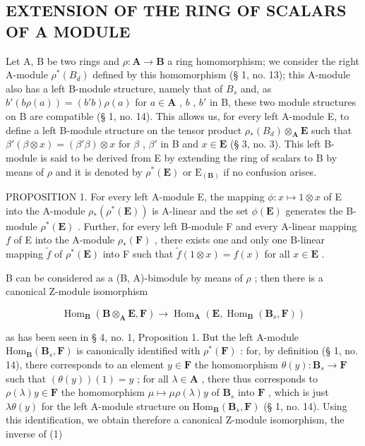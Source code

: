 \subsection{EXTENSION OF THE RING OF SCALARS OF A MODULE}

Let A, B be two rings and \(\rho: \mathbf{A} \to \mathbf{B}\) a ring homomorphism; we consider the right A-module \(\rho^{*}(B_{d})\) defined by this homomorphism (§ 1, no. 13); this A-module also has a left B-module structure, namely that of \(B_{s}\) and, as \(b'(b\rho(a)) = (b'b)\rho(a)\) for \(a \in \mathbf{A}\) , \(b\) , \(b'\) in B, these two module structures on B are compatible (§ 1, no. 14). This allows us, for every left A-module E, to define a left B-module structure on the tensor product \(\rho_{*}(B_{d}) \otimes_{\mathbf{A}} \mathbf{E}\) such that \(\beta'(\beta \otimes x) = (\beta'\beta) \otimes x\) for \(\beta\) , \(\beta'\) in B and \(x \in \mathbf{E}\) (§ 3, no. 3). This left B-module is said to be derived from E by extending the ring of scalars to B by means of \(\rho\) and it is denoted by \(\rho^{*}(\mathbf{E})\) or \(\mathrm{E}_{(\mathbf{B})}\) if no confusion arises.

PROPOSITION 1. For every left A-module E, the mapping \(\phi: x \mapsto 1 \otimes x\) of E into the A-module \(\rho_*(\rho^*(\mathbf{E}))\) is A-linear and the set \(\phi(\mathbf{E})\) generates the B-module \(\rho^*(\mathbf{E})\) . Further, for every left B-module F and every A-linear mapping \(f\) of E into the A-module \(\rho_*(\mathbf{F})\) , there exists one and only one B-linear mapping \(\tilde{f}\) of \(\rho^*(\mathbf{E})\) into F such that \(\tilde{f}(1 \otimes x) = f(x)\) for all \(x \in \mathbf{E}\) .

B can be considered as a (B, A)-bimodule by means of \(\rho\) ; then there is a canonical Z-module isomorphism

\[
\operatorname{Hom} _ {\mathbf {B}} (\mathbf {B} \otimes_ {\mathbf {A}} \mathbf {E}, \mathbf {F}) \rightarrow \operatorname{Hom} _ {\mathbf {A}} (\mathbf {E}, \operatorname{Hom} _ {\mathbf {B}} (\mathbf {B} _ {s}, \mathbf {F}))\tag{1}
\]

as has been seen in § 4, no. 1, Proposition 1. But the left A-module \(\mathrm{Hom}_{\mathbf{B}}(\mathbf{B}_{s},\mathbf{F})\) is canonically identified with \(\rho^{*}(\mathbf{F})\) : for, by definition (§ 1, no. 14), there corresponds to an element \(y\in \mathbf{F}\) the homomorphism \(\theta (y)\colon \mathbf{B}_s\to \mathbf{F}\) such that \((\theta (y))(1) = y\) ; for all \(\lambda \in \mathbf{A}\) , there thus corresponds to \(\rho (\lambda)y\in \mathbf{F}\) the homomorphism \(\mu \mapsto \mu \rho (\lambda)y\) of \(\mathbf{B}_s\) into \(\mathbf{F}\) , which is just \(\lambda \theta (y)\) for the left A-module structure on \(\mathrm{Hom}_{\mathbf{B}}(\mathbf{B}_{s},\mathbf{F})\) (§ 1, no. 14). Using this identification, we obtain therefore a canonical Z-module isomorphism, the inverse of (1)

